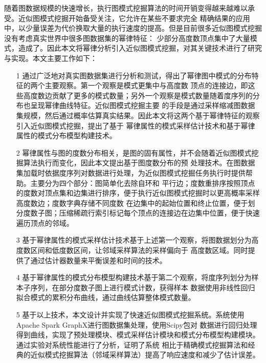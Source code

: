 \documentclass[master]{thesis-uestc}
\begin{document}
    随着图数据规模的快速增长，执行图模式挖掘算法的时间开销变得越来越难以承受。近似图模式挖掘开始备受关注，它允许在某些不要求完全
精确结果的应用中，以少量误差为代价换取大量的执行速度的提高。但是目前很多近似图模式挖掘没有考虑真实世界中很多图数据集的幂律特征：
少部分高度数顶点集中了大量模式，造成了。因此本文将幂律分析引入近似图模式挖掘，对其关键技术进行了研究与实现。本文主要工作如下：

\begin{enumerate}
    \item[1] 通过广泛地对真实图数据集进行分析和测试，得出了幂律图中模式的分布特征的两个主要观察。第一个观察是模式更集中与高度数
    顶点的连接边，即这些高度数边贡献了更多的模式数量；另外一个观察是模式数量随着度序列的分布也呈现幂律曲线特征。近似图模式挖掘主要
    的手段是通过采样缩减图数据集规模，然后通过概率估算真实结果。因此本文将这两个基于幂律特征的观察引入近似图模式挖掘，提出了基于
    幂律属性的模式采样估计技术和基于幂律属性的模式分布模型构建技术。

    \item[2] 幂律属性与图的度数分布相关，是图的固有属性，并不会随着近似图模式挖掘算法执行而变化，因此本文提出基于图度数分布的预
    处理技术。在图数据集加载时依据度序列对数据进行处理，为近似图模式挖掘任务执行时提供帮助。主要分为四个部分：图简单化去除自环和
    平行边；度数重排序按照顶点的度数对顶点集和边集进行排序，便于执行近似图模式挖掘时以更高概率采样高度数边；度数字典存储不同度数
    在边集中的起始位置和终止位置，便于划分度数子图；压缩稀疏行索引标记每个顶点的连接边在边集中位置，便于快速遍历顶点的邻域。
    
    \item[3] 基于幂律属性的模式采样估计技术基于上述第一个观察，将图数据划分为高度数区间和低度数区间，让邻域采样算法的采样偏向于
    高度数区域。同时提供了通过估计器数量来平衡误差和时间的技术。

    \item[4] 基于幂律属性的模式分布模型构建技术基于第二个观察，将度序列划分为样本子序列，在部分度数子图上进行模式计数，获得样本
    数据使用非线性回归拟合模式的累积分布曲线，通过曲线估算整体模式数量。

    \item[5] 基于以上技术，本文设计并实现了快速近似图模式挖掘系统。系统使用Apache Spark GraphX进行图数据集处理，使用Scipy包对
    数据进行回归处理得到曲线，实现了预处理模块、模式采样估计模块和模式分布模型构建模块。通过实验对系统性能进行了分析，证明了系统
    相比于精确模式挖掘算法和经典的近似模式挖掘算法（邻域采样算法）提高了响应速度和减少了估计误差。
    
    
\end{enumerate}
\end{document}
